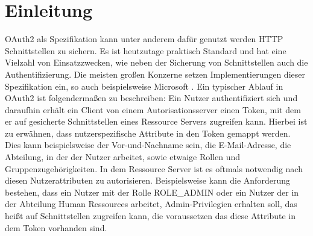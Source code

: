 \chapter{Einleitung}
\label{ch:intro}
OAuth2 als Spezifikation kann unter anderem dafür genutzt werden \ac{HTTP} Schnittstellen zu sichern. Es ist heutzutage praktisch Standard und hat eine Vielzahl von Einsatzzwecken, wie neben der Sicherung von Schnittstellen auch die Authentifizierung. Die meisten großen Konzerne setzen Implementierungen dieser Spezifikation ein, so auch beispielsweise Microsoft \citep{microsoftoauth2:2021:07}. Ein typischer Ablauf in OAuth2 ist folgendermaßen zu beschreiben: Ein Nutzer authentifiziert sich und daraufhin erhält ein Client von einem Autorisationsserver einen Token, mit dem er auf gesicherte Schnittstellen eines Ressource Servers zugreifen kann. Hierbei ist zu erwähnen, dass nutzerspezifische Attribute in den Token gemappt werden. Dies kann beispielsweise der Vor-und-Nachname sein, die E-Mail-Adresse, die Abteilung, in der der Nutzer arbeitet, sowie etwaige Rollen und Gruppenzugehörigkeiten. In dem Ressource Server ist es oftmals notwendig nach diesen Nutzerattributen zu autorisieren. Beispielsweise kann die Anforderung bestehen, dass ein Nutzer mit der Rolle ROLE\_ADMIN oder ein Nutzer der in der Abteilung Human Ressources arbeitet, Admin-Privilegien erhalten soll, das heißt auf Schnittstellen zugreifen kann, die voraussetzen das diese Attribute in dem Token vorhanden sind.\smallskip

